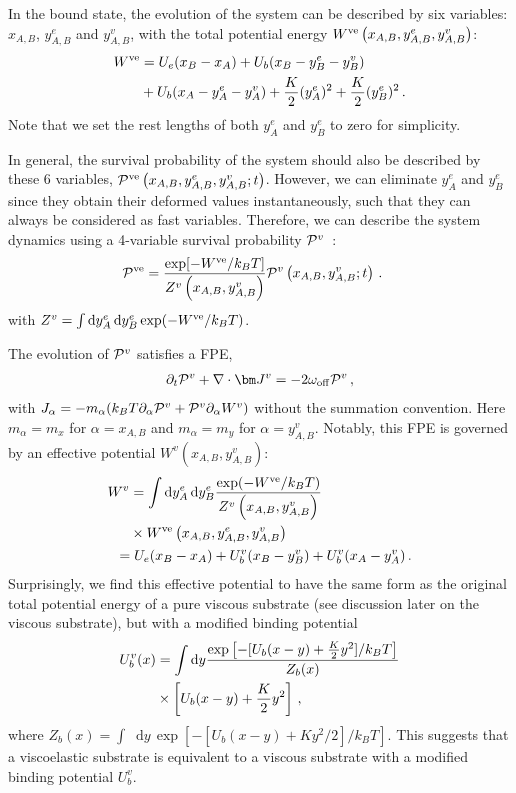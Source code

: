 \documentclass[twocolumn,prl,english]{revtex4-1}
\newcommand*\diff{\mathop{}\!\mathrm{d}}
\begin{document}
In the bound state, the evolution of the system can be described by six variables: $x_{A,B}$, $y_{A,B}^e$ and $y_{A,B}^v$, with the total potential energy $W^{\rm ve}\left(x_{A,B},y_{A,B}^e,y_{A,B}^v\right)$: 
\begin{align}
W^{\rm ve} &=  U_e(x_B-x_A)+U_b(x_B -y_B^e-y_B^v)\notag\\&+U_b(x_A-y_A^e-y_A^v)+\frac{K}2 (y_A^e)^2+\frac{K}2 (y_B^e)^2\,.\label{e9}
\end{align}
Note that we set the rest lengths of both $y_A^e$ and $y_B^e$ to zero for simplicity. 


In general, the survival probability of the system should also be described by these 6 variables, ${\cal P}^{\rm ve}\left(x_{A,B},y_{A,B}^e,y_{A,B}^v;t\right)$. However, we can eliminate $y_A^e$ and $y_B^e$ since they obtain their deformed values instantaneously, such that they can always be considered as fast variables. Therefore, we can describe the system dynamics using a 4-variable survival probability ${\cal P}^v$~\cite{Magnasco1994}:
\begin{align}
{\cal P}^{\rm ve} &=  \frac{\exp[-W^{\rm ve}/k_B T]}{Z^v\left(x_{A,B}, y_{A,B}^v\right)} {\cal P}^{v}\left(x_{A,B}, y_{A,B}^v;t\right)\,.\label{e10}
\end{align}
with $Z^v=\int \diff y_A^e \diff  y_B^e \, {\exp({- W^{\rm ve}/k_BT})}$. 

 The evolution of ${\cal P}^v$ satisfies a FPE, 
\begin{align}
\partial_t {\cal P}^v+\nabla \cdot { {\bm J^v}}= - 2\omega_{\rm off} {\cal P}^v\,,\label{e11}
\end{align}
with $J_\alpha=-m_\alpha( k_B T\partial_\alpha {\cal P}^v+{\cal P}^v  \partial_\alpha W^v)$ without the summation convention. Here $m_\alpha=m_x$ for $\alpha=x_{A,B}$ and  $m_\alpha=m_y$ for $\alpha=y_{A,B}^v$. Notably, this FPE is governed by an effective potential $W^v\left(x_{A,B}, y_{A,B}^v\right)$: 
\begin{align}
W^v&=\int \diff y_A^e \diff y_B^e \frac{  \exp({- W^{\rm ve}/k_BT})}{Z^v\left(x_{A,B}, y_{A,B}^v\right)}\notag\\&\times W^{\rm ve}\left(x_{A,B}, y_{A,B}^e,y_{A,B}^v\right)\notag\\&\!\!\!\!\!\!=U_e(x_B-x_A)+U_b^v(x_B-y_B^v)+U_b^v(x_A-y_A^v)\,.\label{e12}
\end{align}
Surprisingly, we find this effective potential to have the same form as the original total potential energy of a pure viscous substrate (see discussion later on the viscous substrate), but with a modified binding potential
\begin{align}
U_b^v(x)&=\int \diff y\frac{\exp\left[-[U_b(x-y)+\frac K 2 y^2]/k_B T\right]}{Z_b(x)}\notag\\&\times \left[U_b(x-y)+\frac K 2 y^2\right]\,,\label{e13}
\end{align}
where $Z_b(x)=\int \diff y\,{\exp\left[-[U_b(x-y)+ K  y^2/2]/k_B T\right]}$. This suggests that a viscoelastic substrate is equivalent to a viscous substrate with a modified binding potential $U_b^v$. 
\end{document}
